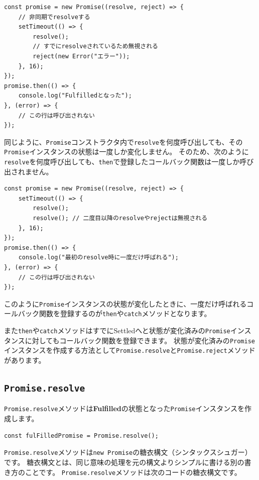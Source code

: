 \begin{lstlisting}
const promise = new Promise((resolve, reject) => {
    // 非同期でresolveする
    setTimeout(() => {
        resolve();
        // すでにresolveされているため無視される
        reject(new Error("エラー"));
    }, 16);
});
promise.then(() => {
    console.log("Fulfilledとなった");
}, (error) => {
    // この行は呼び出されない
});
\end{lstlisting}

同じように、\texttt{Promise}コンストラクタ内で\texttt{resolve}を何度呼び出しても、その\texttt{Promise}インスタンスの状態は一度しか変化しません。
そのため、次のように\texttt{resolve}を何度呼び出しても、\texttt{then}で登録したコールバック関数は一度しか呼び出されません。

\begin{lstlisting}
const promise = new Promise((resolve, reject) => {
    setTimeout(() => {
        resolve();
        resolve(); // 二度目以降のresolveやrejectは無視される
    }, 16);
});
promise.then(() => {
    console.log("最初のresolve時に一度だけ呼ばれる");
}, (error) => {
    // この行は呼び出されない
});
\end{lstlisting}

このように\texttt{Promise}インスタンスの状態が変化したときに、一度だけ呼ばれるコールバック関数を登録するのが\texttt{then}や\texttt{catch}メソッドとなります。

また\texttt{then}や\texttt{catch}メソッドはすでにSettledへと状態が変化済みの\texttt{Promise}インスタンスに対してもコールバック関数を登録できます。
状態が変化済みの\texttt{Promise}インスタンスを作成する方法として\texttt{Promise.resolve}と\texttt{Promise.reject}メソッドがあります。

\hypertarget{promise-resolve}{%
\subsection{\texorpdfstring{\texttt{Promise.resolve}}{Promise.resolve}}\label{promise-resolve}}

\texttt{Promise.resolve}メソッドは\textbf{Fulfilled}の状態となった\texttt{Promise}インスタンスを作成します。

\begin{lstlisting}
const fulFilledPromise = Promise.resolve();
\end{lstlisting}

\texttt{Promise.resolve}メソッドは\texttt{new Promise}の糖衣構文（シンタックスシュガー）です。
糖衣構文とは、同じ意味の処理を元の構文よりシンプルに書ける別の書き方のことです。
\texttt{Promise.resolve}メソッドは次のコードの糖衣構文です。

